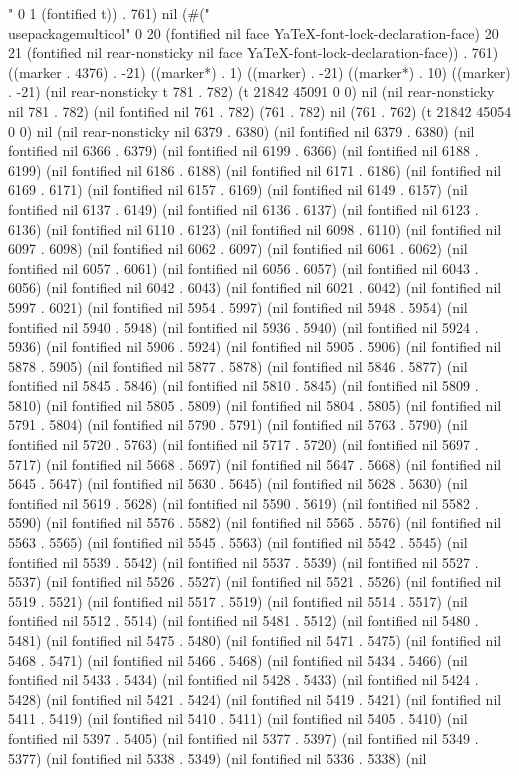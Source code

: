 " 0 1 (fontified t)) . 761) nil (#("\\usepackage{multicol}" 0 20 (fontified nil face YaTeX-font-lock-declaration-face) 20 21 (fontified nil rear-nonsticky nil face YaTeX-font-lock-declaration-face)) . 761) ((marker . 4376) . -21) ((marker*) . 1) ((marker) . -21) ((marker*) . 10) ((marker) . -21) (nil rear-nonsticky t 781 . 782) (t 21842 45091 0 0) nil (nil rear-nonsticky nil 781 . 782) (nil fontified nil 761 . 782) (761 . 782) nil (761 . 762) (t 21842 45054 0 0) nil (nil rear-nonsticky nil 6379 . 6380) (nil fontified nil 6379 . 6380) (nil fontified nil 6366 . 6379) (nil fontified nil 6199 . 6366) (nil fontified nil 6188 . 6199) (nil fontified nil 6186 . 6188) (nil fontified nil 6171 . 6186) (nil fontified nil 6169 . 6171) (nil fontified nil 6157 . 6169) (nil fontified nil 6149 . 6157) (nil fontified nil 6137 . 6149) (nil fontified nil 6136 . 6137) (nil fontified nil 6123 . 6136) (nil fontified nil 6110 . 6123) (nil fontified nil 6098 . 6110) (nil fontified nil 6097 . 6098) (nil fontified nil 6062 . 6097) (nil fontified nil 6061 . 6062) (nil fontified nil 6057 . 6061) (nil fontified nil 6056 . 6057) (nil fontified nil 6043 . 6056) (nil fontified nil 6042 . 6043) (nil fontified nil 6021 . 6042) (nil fontified nil 5997 . 6021) (nil fontified nil 5954 . 5997) (nil fontified nil 5948 . 5954) (nil fontified nil 5940 . 5948) (nil fontified nil 5936 . 5940) (nil fontified nil 5924 . 5936) (nil fontified nil 5906 . 5924) (nil fontified nil 5905 . 5906) (nil fontified nil 5878 . 5905) (nil fontified nil 5877 . 5878) (nil fontified nil 5846 . 5877) (nil fontified nil 5845 . 5846) (nil fontified nil 5810 . 5845) (nil fontified nil 5809 . 5810) (nil fontified nil 5805 . 5809) (nil fontified nil 5804 . 5805) (nil fontified nil 5791 . 5804) (nil fontified nil 5790 . 5791) (nil fontified nil 5763 . 5790) (nil fontified nil 5720 . 5763) (nil fontified nil 5717 . 5720) (nil fontified nil 5697 . 5717) (nil fontified nil 5668 . 5697) (nil fontified nil 5647 . 5668) (nil fontified nil 5645 . 5647) (nil fontified nil 5630 . 5645) (nil fontified nil 5628 . 5630) (nil fontified nil 5619 . 5628) (nil fontified nil 5590 . 5619) (nil fontified nil 5582 . 5590) (nil fontified nil 5576 . 5582) (nil fontified nil 5565 . 5576) (nil fontified nil 5563 . 5565) (nil fontified nil 5545 . 5563) (nil fontified nil 5542 . 5545) (nil fontified nil 5539 . 5542) (nil fontified nil 5537 . 5539) (nil fontified nil 5527 . 5537) (nil fontified nil 5526 . 5527) (nil fontified nil 5521 . 5526) (nil fontified nil 5519 . 5521) (nil fontified nil 5517 . 5519) (nil fontified nil 5514 . 5517) (nil fontified nil 5512 . 5514) (nil fontified nil 5481 . 5512) (nil fontified nil 5480 . 5481) (nil fontified nil 5475 . 5480) (nil fontified nil 5471 . 5475) (nil fontified nil 5468 . 5471) (nil fontified nil 5466 . 5468) (nil fontified nil 5434 . 5466) (nil fontified nil 5433 . 5434) (nil fontified nil 5428 . 5433) (nil fontified nil 5424 . 5428) (nil fontified nil 5421 . 5424) (nil fontified nil 5419 . 5421) (nil fontified nil 5411 . 5419) (nil fontified nil 5410 . 5411) (nil fontified nil 5405 . 5410) (nil fontified nil 5397 . 5405) (nil fontified nil 5377 . 5397) (nil fontified nil 5349 . 5377) (nil fontified nil 5338 . 5349) (nil fontified nil 5336 . 5338) (nil 